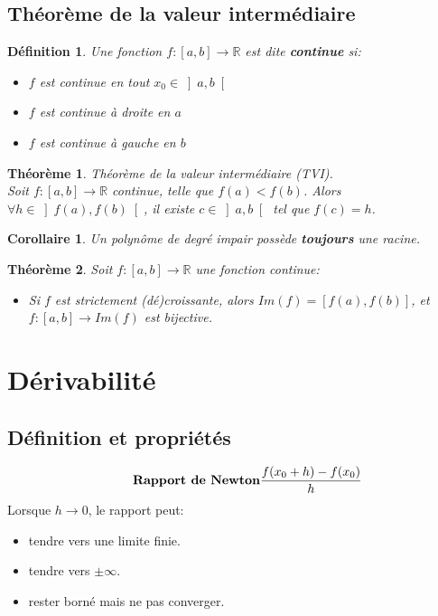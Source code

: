 \documentclass[10pt,a4paper]{book}
\newcommand{\R}{\mathbb{R}}
\newtheorem{theorem}{Théorème}[section]
\newtheorem{definition}{Définition}[section]
\newtheorem{corollaire}{Corollaire}[theorem]
\begin{document}
\section{Théorème de la valeur intermédiaire}

\begin{definition} Une fonction $f: \left[a,b\right] \rightarrow \R$ est dite \textbf{continue} si:
\begin{itemize}
\item $f$ est continue en tout $x_0 \in \left]a,b\right[$
\item $f$ est continue à droite en $a$
\item $f$ est continue à gauche en $b$
\end{itemize}
\end{definition}

\begin{theorem} \label{thm:TVI}
Théorème de la valeur intermédiaire (TVI). \\
Soit $f: \left[a,b\right] \rightarrow \R$ continue, telle que $f(a) < f(b)$. Alors $\forall h \in \left]f(a),f(b)\right[$, il existe $c \in \left]a,b\right[$ tel que $f(c) = h$.
\end{theorem}

\begin{corollaire}
Un polynôme de degré impair possède \textbf{toujours} une racine.
\end{corollaire}

\begin{theorem}
Soit $f: \left[a,b\right] \rightarrow \R$ une fonction continue:
\begin{itemize}
\item Si $f$ est strictement (dé)croissante, alors $Im(f) = \left[f(a),f(b)\right]$, et $f: \left[a,b\right] \rightarrow Im(f)$ est bijective.
\end{itemize}
\end{theorem}

\chapter{Dérivabilité}

\section{Définition et propriétés}

\begin{equation*} \tag*{\textbf{Rapport de Newton}}
\frac{f(x_0 + h) -f(x_0)}{h}
\end{equation*}
Lorsque $h \rightarrow 0$, le rapport peut:
\begin{itemize}
\item tendre vers une limite finie.
\item tendre vers $\pm \infty$.
\item rester borné mais ne pas converger.
\end{itemize}
\end{document}
